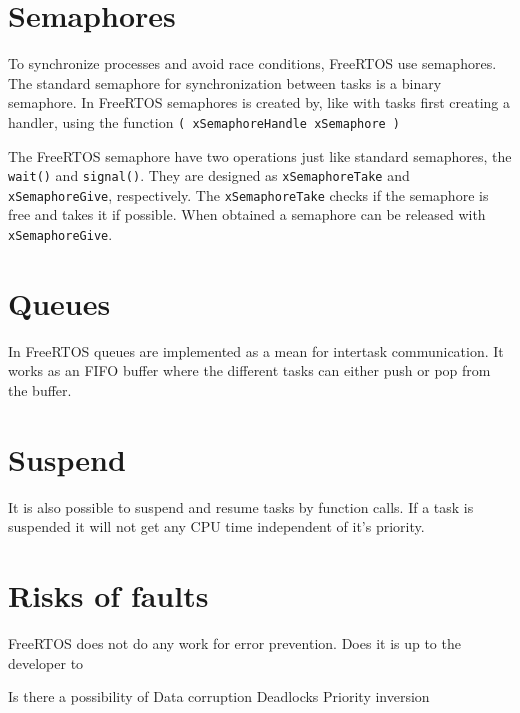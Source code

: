 \section{ Semaphores }

To synchronize processes and avoid race conditions, FreeRTOS use semaphores. The standard semaphore for synchronization between tasks is a binary semaphore. In FreeRTOS semaphores is created by, like with tasks first creating a handler, using the function \texttt{( xSemaphoreHandle xSemaphore )}

The FreeRTOS semaphore have two operations just like standard semaphores, the \texttt{wait()} and \texttt{signal()}. They are designed as \texttt{xSemaphoreTake} and \texttt{xSemaphoreGive}, respectively. The \texttt{xSemaphoreTake} checks if the semaphore is free and takes it if possible.
When obtained a semaphore can be released with \texttt{xSemaphoreGive}.

\section{ Queues }

In FreeRTOS queues are implemented as a mean for intertask communication. It works as an FIFO buffer where the different tasks can either push or pop from the buffer.

\section{ Suspend }
It is also possible to suspend and resume tasks by function calls. If a task is suspended it will not get any CPU time independent of it's priority.

\section{Risks of faults}

FreeRTOS does not do any work for error prevention. Does it is up to the developer to 

Is there a possibility of 
Data corruption
Deadlocks
Priority inversion